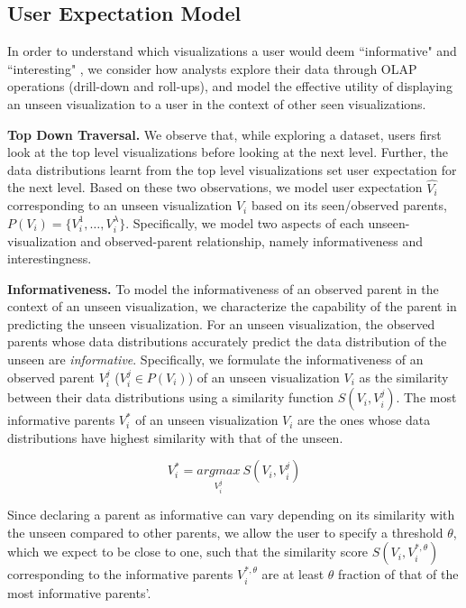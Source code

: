 \subsection{User Expectation Model}
In order to understand which visualizations a user would deem ``informative" and ``interesting" , we consider how analysts explore their data through OLAP operations (drill-down and roll-ups), and model the effective utility of displaying an unseen visualization to a user in the context of other seen visualizations. 

\textbf{Top Down Traversal.} We observe that, while exploring a dataset, users first look at the top level visualizations before looking at the next level. Further, the data distributions learnt from the top level visualizations set user expectation for the next level. Based on these two observations, we model user expectation $\hat{V_i}$ corresponding to an unseen visualization $V_i$ based on its seen/observed parents, $P(V_i) = \{V_i^1, \ldots, V_i^\lambda\}$. Specifically, we model two aspects of each unseen-visualization and observed-parent relationship, namely informativeness and interestingness. 

\textbf{Informativeness.} To model the informativeness of an observed parent in the context of an unseen visualization, we characterize the capability of the parent in predicting the unseen visualization. For an unseen visualization, the observed parents whose data distributions accurately predict the data distribution of the unseen are \emph{informative}. Specifically, we formulate the informativeness of an observed parent $V_i^j$ ($V_i^j \in P(V_i)$) of an unseen visualization $V_i$ as the similarity between their data distributions using a similarity function $S(V_i, V_i^j)$. The most informative parents $V_i^*$ of an unseen visualization $V_i$ are the ones whose data distributions have highest similarity with that of the unseen.

\begin{equation}
    V_i^*=\underset{V_i^j}{argmax}\ S(V_i, V_i^j)
\end{equation}

Since declaring a parent as informative can vary depending on its similarity with the unseen compared to other parents, we allow the user to specify a threshold $\theta$, which we expect to be close to one, such that the similarity score $S(V_i, V_i^{*, \theta})$ corresponding to the informative parents $V_i^{*, \theta}$ are at least $\theta$ fraction of that of the most informative parents'.

